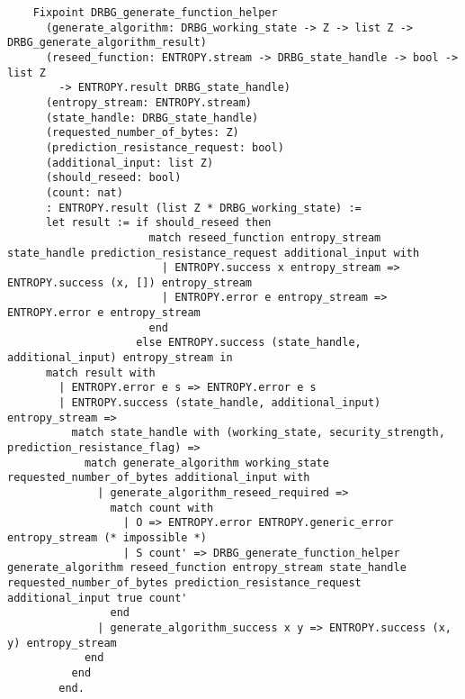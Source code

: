 \documentclass[pageno]{jpaper}
\begin{document}
\begin{lstlisting}
    Fixpoint DRBG_generate_function_helper
      (generate_algorithm: DRBG_working_state -> Z -> list Z -> DRBG_generate_algorithm_result)
      (reseed_function: ENTROPY.stream -> DRBG_state_handle -> bool -> list Z
        -> ENTROPY.result DRBG_state_handle)
      (entropy_stream: ENTROPY.stream)
      (state_handle: DRBG_state_handle)
      (requested_number_of_bytes: Z)
      (prediction_resistance_request: bool)
      (additional_input: list Z)
      (should_reseed: bool)
      (count: nat)
      : ENTROPY.result (list Z * DRBG_working_state) :=
      let result := if should_reseed then
                      match reseed_function entropy_stream state_handle prediction_resistance_request additional_input with
                        | ENTROPY.success x entropy_stream => ENTROPY.success (x, []) entropy_stream
                        | ENTROPY.error e entropy_stream => ENTROPY.error e entropy_stream
                      end
                    else ENTROPY.success (state_handle, additional_input) entropy_stream in
      match result with
        | ENTROPY.error e s => ENTROPY.error e s
        | ENTROPY.success (state_handle, additional_input) entropy_stream =>
          match state_handle with (working_state, security_strength, prediction_resistance_flag) =>
            match generate_algorithm working_state requested_number_of_bytes additional_input with
              | generate_algorithm_reseed_required =>
                match count with
                  | O => ENTROPY.error ENTROPY.generic_error entropy_stream (* impossible *)
                  | S count' => DRBG_generate_function_helper generate_algorithm reseed_function entropy_stream state_handle requested_number_of_bytes prediction_resistance_request additional_input true count'
                end
              | generate_algorithm_success x y => ENTROPY.success (x, y) entropy_stream
            end
          end
        end.


\end{lstlisting}
\end{document}
